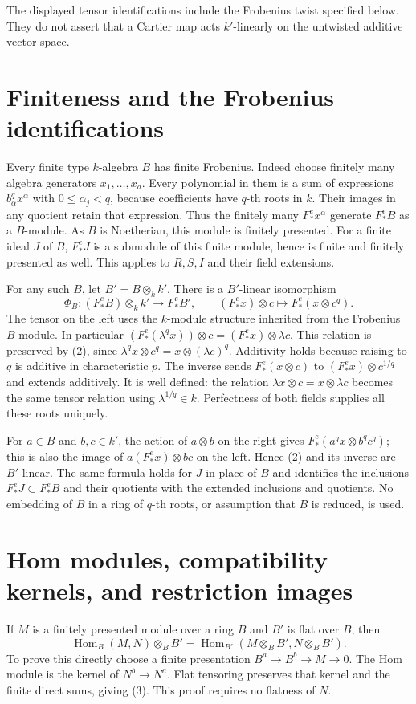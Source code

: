 \documentclass[11pt]{article}
\newcommand{\Hom}{\operatorname{Hom}}
\begin{document}
The displayed tensor identifications include the Frobenius twist
specified below. They do not assert that a Cartier map acts $k'$-linearly
on the untwisted additive vector space.

\section{Finiteness and the Frobenius identifications}
Every finite type $k$-algebra $B$ has finite Frobenius. Indeed choose
finitely many algebra generators $x_1,\ldots,x_a$. Every polynomial
in them is a sum of expressions $b_\alpha^q x^\alpha$ with
$0\leq\alpha_j<q$, because coefficients have $q$-th roots in $k$.
Their images in any quotient retain that expression. Thus the finitely
many $F_*^ex^\alpha$ generate $F_*^eB$ as a $B$-module. As $B$ is
Noetherian, this module is finitely presented. For a finite ideal $J$
of $B$, $F_*^eJ$ is a submodule of this finite module, hence is finite
and finitely presented as well. This applies to $R,S,I$ and their
field extensions.

For any such $B$, let $B'=B\otimes_k k'$. There is a $B'$-linear
isomorphism
\[
 \Phi_B:(F_*^eB)\otimes_k k'\longrightarrow F_*^eB',\qquad
 (F_*^ex)\otimes c\longmapsto F_*^e(x\otimes c^q).          \tag{2}
\]
The tensor on the left uses the $k$-module structure inherited from
the Frobenius $B$-module. In particular
$(F_*^e(\lambda^q x))\otimes c=(F_*^ex)\otimes\lambda c$.
This relation is preserved by (2), since
$\lambda^q x\otimes c^q=x\otimes(\lambda c)^q$.
Additivity holds because raising to $q$ is additive in characteristic
$p$. The inverse sends $F_*^e(x\otimes c)$ to
$(F_*^ex)\otimes c^{1/q}$ and extends additively. It is well defined:
the relation $\lambda x\otimes c=x\otimes\lambda c$ becomes the
same tensor relation using $\lambda^{1/q}\in k$.
Perfectness of both fields supplies all these roots uniquely.

For $a\in B$ and $b,c\in k'$, the action of $a\otimes b$ on the
right gives $F_*^e(a^q x\otimes b^q c^q)$; this is also the image of
$a(F_*^ex)\otimes bc$ on the left. Hence (2) and its inverse are
$B'$-linear. The same formula holds for $J$ in place of $B$ and
identifies the inclusions $F_*^eJ\subset F_*^eB$ and their quotients
with the extended inclusions and quotients. No embedding of $B$ in
a ring of $q$-th roots, or assumption that $B$ is reduced, is used.

\section{Hom modules, compatibility kernels, and restriction images}
If $M$ is a finitely presented module over a ring $B$ and $B'$ is flat
over $B$, then
\[
 \Hom_B(M,N)\otimes_B B'
    =\Hom_{B'}(M\otimes_B B',N\otimes_B B').              \tag{3}
\]
To prove this directly choose a finite presentation
$B^a\to B^b\to M\to0$. The Hom module is the kernel of
$N^b\to N^a$. Flat tensoring preserves that kernel and the finite
direct sums, giving (3). This proof requires no flatness of $N$.
\end{document}
